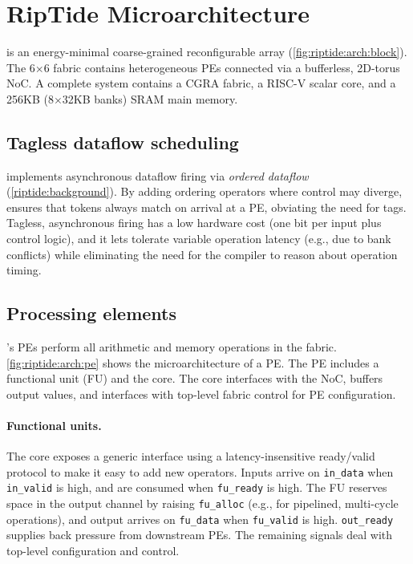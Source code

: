 \section{RipTide Microarchitecture}
\label{riptide:arch}

\riptide is an energy-minimal coarse-grained reconfigurable array (\autoref{fig:riptide:arch:block}).
% 
The 6$\times$6 fabric contains
heterogeneous PEs connected via a bufferless, 2D-torus NoC.
% 
A complete \riptide system contains a CGRA fabric, a RISC-V scalar core, and a 256KB
(8$\times$32KB banks) SRAM main memory.

\subsection{Tagless dataflow scheduling}

\riptide implements asynchronous dataflow firing via \emph{ordered dataflow} (\autoref{riptide:background}).
%
By adding ordering operators where control may diverge,
%
\riptide ensures that tokens always match on arrival at a PE, obviating the need for tags.
%
Tagless, asynchronous firing has a low hardware cost (one bit per input plus
control logic),
%
and it lets \riptide tolerate variable operation latency
(e.g., due to bank conflicts) while eliminating the need for the compiler to reason about
operation timing.

\subsection{Processing elements}
\riptide's PEs perform all arithmetic and memory operations in the fabric.
%
\autoref{fig:riptide:arch:pe} shows the microarchitecture of a PE.
% 
The PE includes a functional unit (FU) and the \textmu core.
% 
The \textmu core interfaces with the NoC, buffers
output values, and interfaces with top-level fabric control for PE configuration.

\paragraph{Functional units.}
The \textmu core exposes a generic interface using a
latency-insensitive ready/valid protocol to make it easy to add new
operators.
%
Inputs arrive on {\tt in\_data} when {\tt in\_valid} is high,
and are consumed when {\tt fu\_ready} is high.
%
The FU reserves space in the output channel by raising {\tt fu\_alloc}
(e.g., for pipelined, multi-cycle operations),
and output arrives on {\tt fu\_data} when {\tt fu\_valid} is high.
%
{\tt out\_ready} supplies back pressure from downstream PEs.
%
The remaining signals deal with top-level configuration and control.

